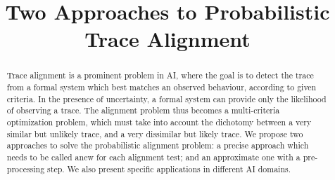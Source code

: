 \documentclass{article}
\title{Two Approaches to Probabilistic Trace Alignment}
\begin{document}
\maketitle

\begin{abstract}
Trace alignment is a prominent problem in AI, where the goal is to detect the trace from a formal 
system which best matches an observed behaviour, according to given criteria. In the presence of uncertainty, a
formal system can provide only the likelihood of observing a trace. The alignment problem thus becomes a multi-criteria
optimization problem, which must take into account the dichotomy between a very similar but unlikely trace, and a very
dissimilar but likely trace. We propose two approaches to solve the probabilistic alignment problem: a precise approach which
needs to be called anew for each alignment test; and an approximate one with a pre-processing step. We also present
specific applications in different AI domains.
\end{abstract}











\end{document}
